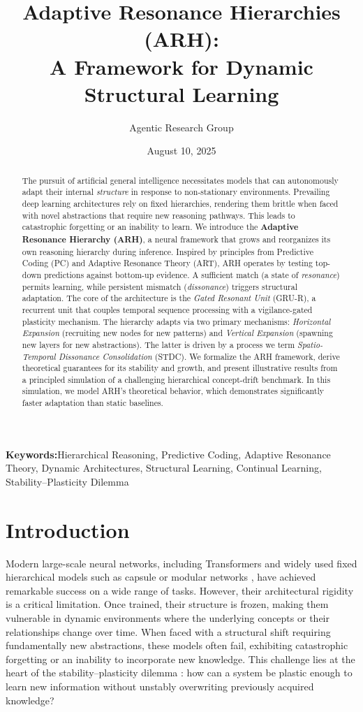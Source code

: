 \documentclass{article}
\title{Adaptive Resonance Hierarchies (ARH): \\ A Framework for Dynamic Structural Learning}
\author{Agentic Research Group}
\date{August 10, 2025}
\newcommand{\keywords}[1]{\par\addvspace\baselineskip\noindent\textbf{Keywords:}\enspace\ignorespaces#1}
\numberwithin{figure}{section}
\numberwithin{table}{section}
\numberwithin{algorithm}{section}
\begin{document}
\maketitle

\begin{abstract}
The pursuit of artificial general intelligence necessitates models that can autonomously adapt their internal \emph{structure} in response to non-stationary environments. Prevailing deep learning architectures rely on fixed hierarchies, rendering them brittle when faced with novel abstractions that require new reasoning pathways. This leads to catastrophic forgetting or an inability to learn. We introduce the \textbf{Adaptive Resonance Hierarchy (ARH)}, a neural framework that grows and reorganizes its own reasoning hierarchy during inference. Inspired by principles from Predictive Coding (PC) and Adaptive Resonance Theory (ART), ARH operates by testing top-down predictions against bottom-up evidence. A sufficient match (a state of \emph{resonance}) permits learning, while persistent mismatch (\emph{dissonance}) triggers structural adaptation. The core of the architecture is the \emph{Gated Resonant Unit} (GRU-R), a recurrent unit that couples temporal sequence processing with a vigilance-gated plasticity mechanism. The hierarchy adapts via two primary mechanisms: \emph{Horizontal Expansion} (recruiting new nodes for new patterns) and \emph{Vertical Expansion} (spawning new layers for new abstractions). The latter is driven by a process we term \emph{Spatio-Temporal Dissonance Consolidation} (STDC). We formalize the ARH framework, derive theoretical guarantees for its stability and growth, and present illustrative results from a principled simulation of a challenging hierarchical concept-drift benchmark. In this simulation, we model ARH's theoretical behavior, which demonstrates significantly faster adaptation than static baselines.
\end{abstract}

\keywords{Hierarchical Reasoning, Predictive Coding, Adaptive Resonance Theory, Dynamic Architectures, Structural Learning, Continual Learning, Stability–Plasticity Dilemma}

\section{Introduction}
Modern large-scale neural networks, including Transformers \citep{Vaswani2017} and widely used fixed hierarchical models such as capsule or modular networks \citep{Sabour2017,Andreas2016}, have achieved remarkable success on a wide range of tasks. However, their architectural rigidity is a critical limitation. Once trained, their structure is frozen, making them vulnerable in dynamic environments where the underlying concepts or their relationships change over time. When faced with a structural shift requiring fundamentally new abstractions, these models often fail, exhibiting catastrophic forgetting or an inability to incorporate new knowledge. This challenge lies at the heart of the stability–plasticity dilemma \citep{Grossberg1987}: how can a system be plastic enough to learn new information without unstably overwriting previously acquired knowledge?
\end{document}

